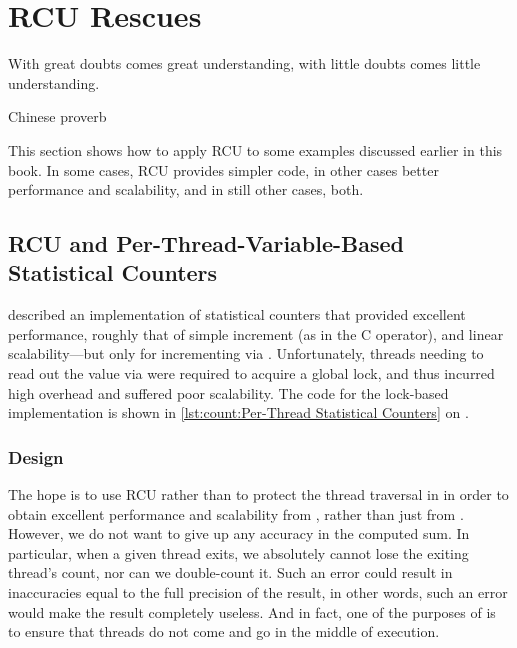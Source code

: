 
\section{RCU Rescues}
\label{sec:together:RCU Rescues}
%
\epigraph{With great doubts comes great understanding, with little doubts
	  comes little understanding.}
	 {Chinese proverb}

This section shows how to apply RCU to some examples discussed earlier
in this book.
In some cases, RCU provides simpler code, in other cases better
performance and scalability, and in still other cases, both.

\subsection{RCU and Per-Thread-Variable-Based Statistical Counters}
\label{sec:together:RCU and Per-Thread-Variable-Based Statistical Counters}

described an implementation of statistical counters that provided
excellent
performance, roughly that of simple increment (as in the C \co{++}
operator), and linear scalability---but only for incrementing
via .
Unfortunately, threads needing to read out the value via 
were required to acquire a global
lock, and thus incurred high overhead and suffered poor scalability.
The code for the lock-based implementation is shown in
\cref{lst:count:Per-Thread Statistical Counters} on
.

\QuickQuizEnd

\subsubsection{Design}

The hope is to use RCU rather than  to protect the
thread traversal in  in order to obtain excellent
performance and scalability from , rather than just
from .
However, we do not want to give up any accuracy in the computed sum.
In particular, when a given thread exits, we absolutely cannot
lose the exiting thread's count, nor can we double-count it.
Such an error could result in inaccuracies equal to the full
precision of the result, in other words, such an error would
make the result completely useless.
And in fact, one of the purposes of  is to
ensure that threads do not come and go in the middle of 
execution.

